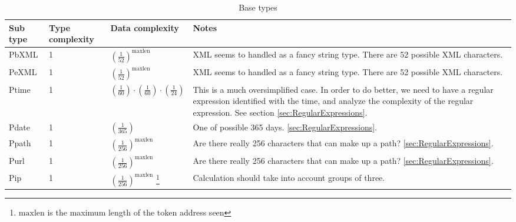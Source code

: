 \begin{longtable}{||l|l|l|l|}
\caption[Base types]{Base types}
\label{tab:v2Base}
\\\hline
\hline
Sub type & Type complexity & Data complexity & Notes \\\hline\hline

\textsf{PbXML} & 1 & $\left(\frac{1}{52}\right)^\mathrm{maxlen} $ &
\parbox[t]{5cm}{
XML seems to handled as a fancy string type. There are 52 possible XML
characters.
\vspace{0.5mm}} \\\hline

\textsf{PeXML} & 1 & $\left(\frac{1}{52}\right)^\mathrm{maxlen}$ &
\parbox[t]{5cm}{
XML seems to handled as a fancy string type. There are 52 possible XML
characters.
\vspace{0.5mm}} \\\hline

\textsf{Ptime} & 1 &
      $\left(\frac{1}{60}\right) \cdot \left(\frac{1}{60}\right) \cdot \left(\frac{1}{24}\right)$ &
\parbox[t]{5cm}{
This is a much oversimplified case. In order to do better, we need to
have a regular expression identified with the time, and analyze the
complexity of the regular expression. See section
\ref{sec:RegularExpressions}.
\vspace{0.5mm}} \\\hline

\textsf{Pdate} & 1 & $\left(\frac{1}{365}\right)$ &
\parbox[t]{5cm}{ One of possible 365 days.
\ref{sec:RegularExpressions}.
\vspace{0.5mm}} \\\hline

\textsf{Ppath} & 1 & $\left(\frac{1}{256}\right)^\mathrm{maxlen}$ &
\parbox[t]{5cm}{ Are there really 256 characters that can make up a path?
\ref{sec:RegularExpressions}.
\vspace{0.5mm}} \\\hline

\textsf{Purl} & 1 & $\left(\frac{1}{256}\right)^\mathrm{maxlen}$ &
\parbox[t]{5cm}{ Are there really 256 characters that can make up a path?
\ref{sec:RegularExpressions}.
\vspace{0.5mm}} \\\hline

\textsf{Pip} & 1 & $\left(\frac{1}{256}\right)^\mathrm{maxlen}$
\footnote{$\mathrm{maxlen}$ is the maximum length of the token address seen} &
\parbox[t]{5cm}{
Calculation should take into account groups of three.
\vspace{0.5mm}} \\\hline


\end{longtable}
